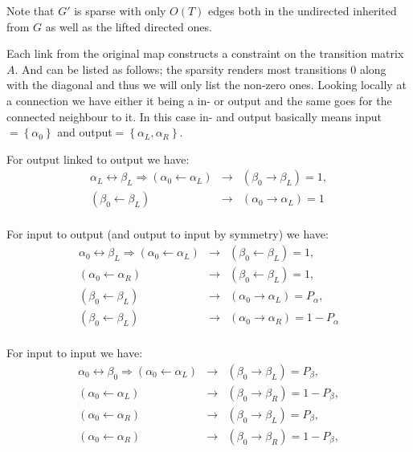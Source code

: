 \documentclass[a4paper,twoside=false,abstract=false,numbers=noenddot,
titlepage=false,headings=small,parskip=half,version=last]{scrartcl}
\begin{document}
\begin{solution}
    Note that $G'$ is sparse with only $O(T)$ edges both in the
    undirected inherited from $G$ as well as the lifted directed ones.

    Each link from the original map constructs a constraint on the transition
    matrix $A$. And can be listed as follows; the sparsity renders most
    transitions $0$ along with the diagonal and thus we will only list the
    non-zero ones.
    Looking locally at a connection we have either it being a in- or output and 
    the same goes for the connected neighbour to it. In this case in- and
    output basically means input$=\left\{\alpha_0\right\}$ and
    output$=\left\{\alpha_L,\alpha_R\right\}$.

    For output linked to output we have:
    \begin{eqnarray}
        \alpha_L\leftrightarrow\beta_L \Rightarrow 
        (\alpha_0\leftarrow\alpha_L) 
            &\rightarrow&
        (\beta_0\rightarrow\beta_L) 
        = 1,\nonumber \\
        (\beta_0\leftarrow\beta_L) 
            &\rightarrow&
        (\alpha_0\rightarrow\alpha_L) 
        = 1 \nonumber \\
    \end{eqnarray}
    
    For input to output (and output to input by symmetry) we have:
    \begin{eqnarray}
        \alpha_0\leftrightarrow\beta_L \Rightarrow 
        (\alpha_0\leftarrow\alpha_L)
            &\rightarrow&
        (\beta_0\leftarrow\beta_L) = 1, \nonumber \\
        (\alpha_0\leftarrow\alpha_R)
            &\rightarrow&
        (\beta_0\leftarrow\beta_L) = 1, \nonumber \\
        (\beta_0\leftarrow\beta_L)
            &\rightarrow&
        (\alpha_0\rightarrow\alpha_L) = P_\alpha, \nonumber \\
        (\beta_0\leftarrow\beta_L)
            &\rightarrow&
        (\alpha_0\rightarrow\alpha_R) = 1-P_\alpha \nonumber \\
    \end{eqnarray}

    For input to input we have:
    \begin{eqnarray}
        \alpha_0\leftrightarrow\beta_0 \Rightarrow 
        (\alpha_0\leftarrow\alpha_L)
            &\rightarrow&
        (\beta_0\rightarrow\beta_L) = P_\beta, \nonumber \\
        (\alpha_0\leftarrow\alpha_L)
            &\rightarrow&
        (\beta_0\rightarrow\beta_R) = 1-P_\beta, \nonumber \\
        (\alpha_0\leftarrow\alpha_R)
            &\rightarrow&
        (\beta_0\rightarrow\beta_L) = P_\beta, \nonumber \\
        (\alpha_0\leftarrow\alpha_R)
            &\rightarrow&
        (\beta_0\rightarrow\beta_R) = 1-P_\beta, \nonumber \\
    \end{eqnarray}


\end{solution}
\end{document}
